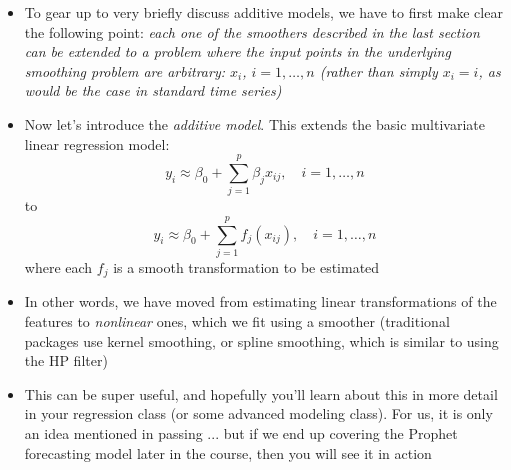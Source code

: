 \documentclass{article}
\begin{document}
\begin{itemize}
\item To gear up to very briefly discuss additive models, we have to first
  make clear the following point: \emph{each one of the smoothers described in
    the last section can be extended to a problem where the input points in the
    underlying smoothing problem are arbitrary: $x_i$, $i = 1,\dots,n$ (rather
    than simply $x_i = i$, as would be the case in standard time series)}

\item Now let's introduce the \emph{additive model}. This extends the basic
  multivariate linear regression model:
  \[
  y_i \approx \beta_0 + \sum_{j=1}^p \beta_j x_{ij}, \quad i = 1,\dots,n
  \]
  to 
  \[
  y_i \approx \beta_0 + \sum_{j=1}^p f_j(x_{ij}), \quad i = 1,\dots,n
  \]
  where each $f_j$ is a smooth transformation to be estimated

\item In other words, we have moved from estimating linear transformations of
  the features to \emph{nonlinear} ones, which we fit using a smoother
  (traditional packages use kernel smoothing, or spline smoothing, which is
  similar to using the HP filter) 

\item This can be super useful, and hopefully you'll learn about this in more
  detail in your regression class (or some advanced modeling class). For us, it
  is only an idea mentioned in passing ... but if we end up covering the Prophet 
  forecasting model later in the course, then you will see it in action 
\end{itemize}
\end{document}
